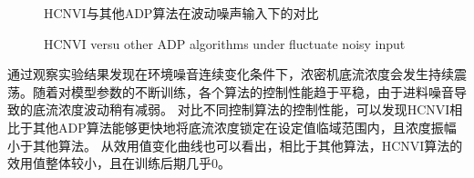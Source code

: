 \begin{figure}[!ht]
\centering \subfigure{\label{fig:concentraion_out_exp1_noise}}
\addtocounter{subfigure}{-2} 
\subfigure{\label{fig:cost_exp1_noise}} \addtocounter{subfigure}{-2}
 \centering


    \caption{HCNVI与其他ADP算法在波动噪声输入下的对比}

  \addtocounter{figure}{-1}
  \vspace{-5pt}
  \renewcommand{\figurename}{Fig.}
  \caption{HCNVI versu other ADP algorithms under fluctuate noisy input}
  \renewcommand{\figurename}{图}

    \label{fig:noise_HCNVI_HDP}
\end{figure}


通过观察实验结果发现在环境噪音连续变化条件下，浓密机底流浓度会发生持续震荡。随着对模型参数的不断训练，各个算法的控制性能趋于平稳，由于进料噪音导致的底流浓度波动稍有减弱。
对比不同控制算法的控制性能，可以发现HCNVI相比于其他ADP算法能够更快地将底流浓度锁定在设定值临域范围内，且浓度振幅小于其他算法。
从效用值变化曲线也可以看出，相比于其他算法，HCNVI算法的效用值整体较小，且在训练后期几乎0。

